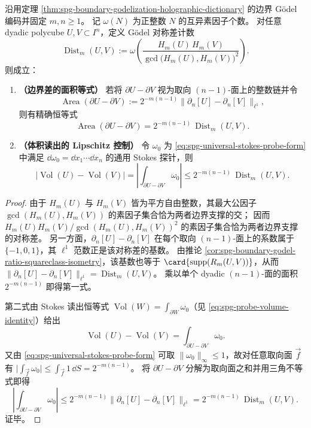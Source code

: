 \begin{theorem}\label{thm:spg-godel-boundary-gcd-lipschitz-stability}
沿用定理 \ref{thm:spg-boundary-godelization-holographic-dictionary} 的边界 Gödel 编码并固定 \(m,n\ge 1\)。
记 \(\omega(N)\) 为正整数 \(N\) 的互异素因子个数。
对任意 dyadic polycube \(U,V\subset I^n\)，定义 Gödel 对称差计数
\[
\operatorname{Dist}_m(U,V)
:=\omega\!\left(\frac{H_m(U)\,H_m(V)}{\gcd\!\bigl(H_m(U),H_m(V)\bigr)^2}\right).
\]
则成立：
\begin{enumerate}
  \item \textbf{（边界差的面积等式）}
        若将 \(\partial U-\partial V\) 视为取向 \((n-1)\)-面上的整数链并令
        \[
        \operatorname{Area}(\partial U-\partial V)
        :=2^{-m(n-1)}\bigl\|\partial_n[U]-\partial_n[V]\bigr\|_{\ell^1},
        \]
        则有精确恒等式
        \[
        \operatorname{Area}(\partial U-\partial V)=2^{-m(n-1)}\,\operatorname{Dist}_m(U,V).
        \]
  \item \textbf{（体积读出的 Lipschitz 控制）}
        令 \(\omega_0\) 为 \eqref{eq:spg-universal-stokes-probe-form} 中满足 \(\dd\omega_0=\dd x_1\cdots\dd x_n\) 的通用 Stokes 探针，则
        \[
        \bigl|\operatorname{Vol}(U)-\operatorname{Vol}(V)\bigr|
        =\left|\int_{\partial U-\partial V}\omega_0\right|
        \le 2^{-m(n-1)}\,\operatorname{Dist}_m(U,V).
        \]
\end{enumerate}
\end{theorem}
\begin{proof}
由于 \(H_m(U)\) 与 \(H_m(V)\) 皆为平方自由整数，其最大公因子 \(\gcd(H_m(U),H_m(V))\) 的素因子集合恰为两者边界支撑的交；
因而
\(
H_m(U)H_m(V)/\gcd(H_m(U),H_m(V))^2
\)
的素因子集合恰为两者边界支撑的对称差。
另一方面，\(\partial_n[U]-\partial_n[V]\) 在每个取向 \((n-1)\)-面上的系数属于 \(\{-1,0,1\}\)，其 \(\ell^1\) 范数正是该对称差的基数。
由推论 \ref{cor:spg-boundary-godel-ratio-squareclass-isometry}，该基数也等于 \(\card{\mathrm{supp}(R_m(U,V))}\)，从而
\(
\|\partial_n[U]-\partial_n[V]\|_{\ell^1}=\operatorname{Dist}_m(U,V)
\)。
乘以单个 dyadic \((n-1)\)-面的面积 \(2^{-m(n-1)}\) 即得第一式。
\par
第二式由 Stokes 读出恒等式 \(\operatorname{Vol}(W)=\int_{\partial W}\omega_0\)（见 \eqref{eq:spg-probe-volume-identity}）给出
\[
\operatorname{Vol}(U)-\operatorname{Vol}(V)=\int_{\partial U-\partial V}\omega_0.
\]
又由 \eqref{eq:spg-universal-stokes-probe-form} 可取 \(\|\omega_0\|_\infty\le 1\)，故对任意取向面 \(\vec f\) 有
\(
\bigl|\int_{\vec f}\omega_0\bigr|\le \int_{\vec f}1\,\dd S=2^{-m(n-1)}
\)。
将 \(\partial U-\partial V\) 分解为取向面之和并用三角不等式即得
\[
\left|\int_{\partial U-\partial V}\omega_0\right|
\le 2^{-m(n-1)}\bigl\|\partial_n[U]-\partial_n[V]\bigr\|_{\ell^1}
=2^{-m(n-1)}\,\operatorname{Dist}_m(U,V).
\]
证毕。
\end{proof}

